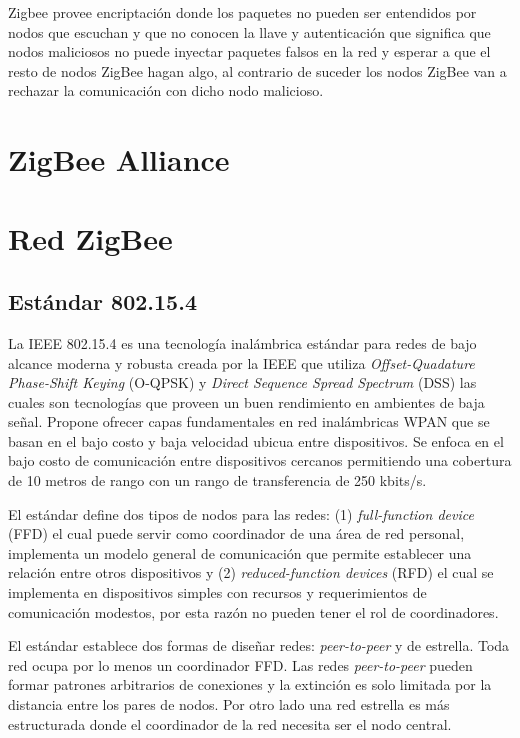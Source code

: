 \documentclass[10pt,journal,compsoc]{IEEEtran}
\begin{document}
Zigbee provee encriptación donde los paquetes no pueden ser entendidos por nodos que escuchan y que no conocen la llave y autenticación que significa que nodos maliciosos no puede inyectar paquetes falsos en la red y esperar a que el resto de nodos ZigBee hagan algo, al contrario de suceder los nodos ZigBee van a rechazar la comunicación con dicho nodo malicioso.

\section{ZigBee Alliance}
 

\section{Red ZigBee}
\subsection{Estándar 802.15.4}
La IEEE 802.15.4 es una tecnología inalámbrica estándar para redes de bajo alcance moderna y robusta creada por la IEEE que utiliza \emph{Offset-Quadature Phase-Shift Keying} (O-QPSK) y \emph{Direct Sequence Spread Spectrum} (DSS) las cuales son tecnologías que proveen un buen rendimiento en ambientes de baja señal. Propone ofrecer capas fundamentales en red inalámbricas WPAN que se basan en el bajo costo y baja velocidad ubicua entre dispositivos. Se enfoca en el bajo costo de comunicación entre dispositivos cercanos permitiendo una cobertura de 10 metros de rango con un rango de transferencia de 250 kbits/s. 

El estándar define dos tipos de nodos para las redes: (1) \emph{full-function device} (FFD) el cual puede servir como coordinador de una área de red personal, implementa un modelo general de comunicación que permite establecer una relación entre otros dispositivos y (2) \emph{reduced-function devices} (RFD) el cual se implementa en dispositivos simples con recursos y requerimientos de comunicación modestos, por esta razón no pueden tener el rol de coordinadores. 

El estándar establece dos formas de diseñar redes: \emph{peer-to-peer} y de estrella. Toda red ocupa por lo menos un coordinador FFD. Las redes \emph{peer-to-peer} pueden formar patrones arbitrarios de conexiones y la extinción es solo limitada por la distancia entre los pares de nodos. Por otro lado una red estrella es más estructurada donde el coordinador de la red necesita ser el nodo central.
\end{document}
